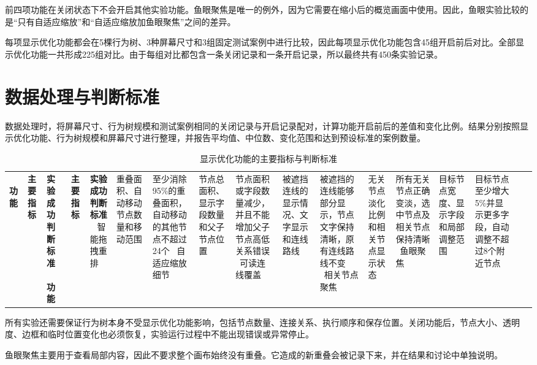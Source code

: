 \documentclass[11pt,a4paper,oneside,extrafontsizes]{memoir}
\begin{document}
前四项功能在关闭状态下不会开启其他实验功能。鱼眼聚焦是唯一的例外，因为它需要在缩小后的概览画面中使用。因此，鱼眼实验比较的是“只有自适应缩放”和“自适应缩放加鱼眼聚焦”之间的差异。

每项显示优化功能都会在5棵行为树、3种屏幕尺寸和3组固定测试案例中进行比较，因此每项显示优化功能包含45组开启前后对比。全部显示优化功能一共形成225组对比。由于每组对比都包含一条关闭记录和一条开启记录，所以最终共有450条实验记录。

\section{数据处理与判断标准}

数据处理时，将屏幕尺寸、行为树规模和测试案例相同的关闭记录与开启记录配对，计算功能开启前后的差值和变化比例。结果分别按照显示优化功能、行为树规模和屏幕尺寸进行整理，并报告平均值、中位数、变化范围和达到预设标准的案例数量。


\begin{center}

\begin{longtable}{@{}p{} p{} p{}@{}}
\caption{显示优化功能的主要指标与判断标准}\label{tab:display-metrics-criteria}\
\toprule
\textbf{功能} & \textbf{主要指标} & \textbf{实验成功判断标准} \
\midrule
\endfirsthead
\multicolumn{3}{l}{\itshape 续表}\
\toprule
\textbf{功能} & \textbf{主要指标} & \textbf{实验成功判断标准} \
\midrule
\endhead
智能拖拽重排 & 重叠面积、自动移动节点数量和移动范围 & 至少消除95\%的重叠面积，自动移动的其他节点不超过24个 \
自适应缩放细节 & 节点总面积、显示字段数量和父子节点位置 & 节点面积或字段数量减少，并且不能增加父子节点高低关系错误 \
可读连线覆盖 & 被遮挡连线的显示情况、文字显示和连线路线 & 被遮挡的连线能够部分显示，节点文字保持清晰，原有连线路线不变 \
相关节点聚焦 & 无关节点淡化比例和相关节点显示状态 & 所有无关节点正确变淡，选中节点及相关节点保持清晰 \
鱼眼聚焦 & 目标节点宽度、显示字段和局部调整范围 & 目标节点至少增大5\%并显示更多字段，自动调整不超过8个附近节点 \
\bottomrule
\end{longtable}
\end{center}

所有实验还需要保证行为树本身不受显示优化功能影响，包括节点数量、连接关系、执行顺序和保存位置。关闭功能后，节点大小、透明度、边框和临时位置变化也必须恢复，实验运行过程中不能出现错误或异常停止。

鱼眼聚焦主要用于查看局部内容，因此不要求整个画布始终没有重叠。它造成的新重叠会被记录下来，并在结果和讨论中单独说明。
\end{document}
